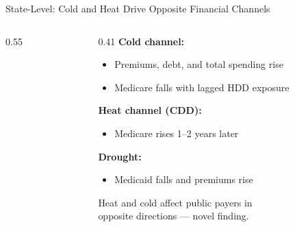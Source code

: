 \documentclass[aspectratio=169,11pt]{beamer}
\newcommand{\tealtext}[1]{{\color{Teal}#1}}
\begin{document}
\begin{frame}{State-Level: Cold and Heat Drive Opposite Financial Channels}
\begin{columns}[T]
\begin{column}{0.55\textwidth}
\begin{center}
      \end{center}
    \end{column}
    \begin{column}{0.41\textwidth}
      \footnotesize
      \textbf{Cold channel:}
      \begin{itemize}\itemsep0.10em
        \item Premiums, debt, and total spending rise
        \item Medicare falls with lagged HDD exposure
      \end{itemize}
      \vspace{0.15em}
      \textbf{Heat channel (CDD):}
      \begin{itemize}\itemsep0.10em
        \item Medicare rises 1--2 years later
      \end{itemize}
      \vspace{0.15em}
      \textbf{Drought:}
      \begin{itemize}\itemsep0.10em
        \item Medicaid falls and premiums rise
      \end{itemize}
      \vspace{0.15em}
      \tealtext{\footnotesize Heat and cold affect public payers in\\opposite directions --- novel finding.}
    \end{column}
  \end{columns}
\end{frame}
\end{document}
